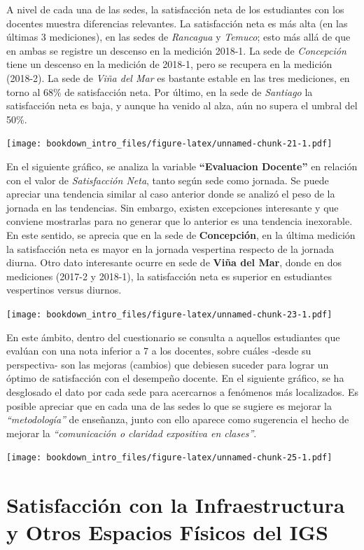 \documentclass[]{book}
\begin{document}
A nivel de cada una de las sedes, la satisfacción neta de los
estudiantes con los docentes muestra diferencias relevantes. La
satisfacción neta es más alta (en las últimas 3 mediciones), en las
sedes de \emph{Rancagua} y \emph{Temuco}; esto más allá de que en ambas
se registre un descenso en la medición 2018-1. La sede de
\emph{Concepción} tiene un descenso en la medición de 2018-1, pero se
recupera en la medición (2018-2). La sede de \emph{Viña del Mar} es
bastante estable en las tres mediciones, en torno al 68\% de
satisfacción neta. Por último, en la sede de \emph{Santiago} la
satisfacción neta es baja, y aunque ha venido al alza, aún no supera el
umbral del 50\%.

\texttt{[image: bookdown\_intro\_files/figure-latex/unnamed-chunk-21-1.pdf]}

En el siguiente gráfico, se analiza la variable \textbf{``Evaluacion
Docente''} en relación con el valor de \emph{Satisfacción Neta}, tanto
según sede como jornada. Se puede apreciar una tendencia similar al caso
anterior donde se analizó el peso de la jornada en las tendencias. Sin
embargo, existen excepciones interesante y que conviene mostrarlas para
no generar que lo anterior es una tendencia inexorable. En este sentido,
se aprecia que en la sede de \textbf{Concepción}, en la última medición
la satisfacción neta es mayor en la jornada vespertina respecto de la
jornada diurna. Otro dato interesante ocurre en sede de \textbf{Viña del
Mar}, donde en dos mediciones (2017-2 y 2018-1), la satisfacción neta es
superior en estudiantes vespertinos versus diurnos.

\texttt{[image: bookdown\_intro\_files/figure-latex/unnamed-chunk-23-1.pdf]}

En este ámbito, dentro del cuestionario se consulta a aquellos
estudiantes que evalúan con una nota inferior a 7 a los docentes, sobre
cuáles -desde su perspectiva- son las mejoras (cambios) que debiesen
suceder para lograr un óptimo de satisfacción con el desempeño docente.
En el siguiente gráfico, se ha desglosado el dato por cada sede para
acercarnos a fenómenos más localizados. Es posible apreciar que en cada
una de las sedes lo que se sugiere es mejorar la \emph{``metodología''}
de enseñanza, junto con ello aparece como sugerencia el hecho de mejorar
la \emph{``comunicación o claridad expositiva en clases''}.

\texttt{[image: bookdown\_intro\_files/figure-latex/unnamed-chunk-25-1.pdf]}

\section{Satisfacción con la Infraestructura y Otros Espacios Físicos
del
IGS}\label{satisfaccion-con-la-infraestructura-y-otros-espacios-fisicos-del-igs}
\end{document}
